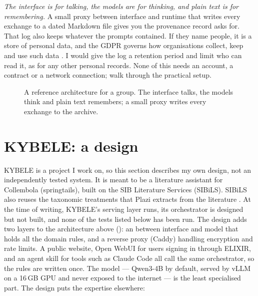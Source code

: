 \emph{The interface is for talking, the models are for thinking, and plain text
is for remembering.} A small proxy between interface and runtime that writes
every exchange to a dated Markdown file gives you the provenance record
 asks for. That log also keeps whatever the prompts
contained. If they name people, it is a store of personal data, and the GDPR
governs how organisations collect, keep and use such data
\parencite{anand2026digitalsovereignty}. I would give the log a retention
period and limit who can read it, as for any other personal records. None of
this needs an account, a contract or
a network connection; \textcite{confidence2026localstack} walk through the
practical setup.

\begin{figure}[htbp]
\centering
{}
\caption{A reference architecture for a group. The interface talks, the models
think and plain text remembers; a small proxy writes every exchange to the
archive.}
\label{fig:architecture}
\end{figure}

\section{KYBELE: a design}

KYBELE is a project I work on, so this section describes my own design, not
an independently tested system. It is meant to be a literature assistant for
Collembola (springtails), built on the SIB Literature Services (SIBiLS).
SIBiLS also reuses the taxonomic treatments that Plazi extracts from the
literature \parencite{agosti2022treatments}. At the time of writing, KYBELE's
serving layer runs, its orchestrator is designed but not built, and none of
the tests listed below has been run. The design adds two layers
to the architecture above (): an  between interface and model
that holds all the domain rules, and a reverse proxy (Caddy) handling encryption
and rate limits. A public website, Open WebUI for users signing in through
ELIXIR, and an agent skill for tools such as Claude Code all call the same
orchestrator, so the rules are written once. The model --- Qwen3-4B by default,
served by vLLM on a 16\,GB GPU and never exposed to the internet --- is the least
specialised part. The design puts the expertise elsewhere:

